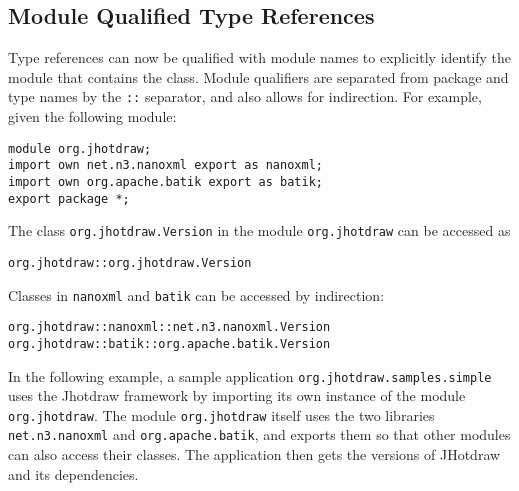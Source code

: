 
\subsection{Module Qualified Type References}

Type references can now be qualified with module names to explicitly
identify the module that contains the class. Module qualifiers
are separated from package and type names by the \texttt{::} separator,
and also allows for indirection. For example, given the following module:

\begin{lstlisting}
module org.jhotdraw;
import own net.n3.nanoxml export as nanoxml;
import own org.apache.batik export as batik;
export package *;
\end{lstlisting}

The class \texttt{org.jhotdraw.Version} in the module \texttt{org.jhotdraw}
can be accessed as
\begin{lstlisting}
org.jhotdraw::org.jhotdraw.Version
\end{lstlisting}
Classes in \texttt{nanoxml} and \texttt{batik} can be accessed by indirection:
\begin{lstlisting}
org.jhotdraw::nanoxml::net.n3.nanoxml.Version
org.jhotdraw::batik::org.apache.batik.Version
\end{lstlisting}

In the following example, a sample application \texttt{org.jhotdraw.samples.simple}
uses the Jhotdraw framework by importing its own instance of the module
\texttt{org.jhotdraw}. The module \texttt{org.jhotdraw} itself uses the 
two libraries \texttt{net.n3.nanoxml} and \texttt{org.apache.batik}, and
exports them so that other modules can also access their classes. The 
application then gets the versions of JHotdraw and its dependencies.

